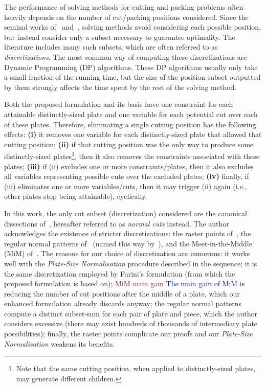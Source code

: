 \documentclass[ppgc,tese,english,formais,babel]{iiufrgs}
\newif\iffinalversion
\newcommand{\newtext}[1]{\iffinalversion%
#1%
\else%
\textcolor{blue}{#1}%
\fi%
}
\newcommand{\oldtext}[1]{\iffinalversion%
\else%
\textcolor{red}{#1}%
\fi%
}
\begin{document}
The performance of solving methods for cutting and packing problems often heavily depends on the number of cut/packing positions considered.
Since the seminal works of~\citet{cw:1977} and~\citet{herz:1972}, solving methods avoid considering each possible position, but instead consider only a subset necessary to guarantee optimality.
The literature includes many such subsets, which are often referred to as \emph{discretizations}.
The most common way of computing these discretizations are Dynamic Programming (DP) algorithms.
These DP algorithms usually only take a small fraction of the running time, but the size of the position subset outputted by them strongly affects the time spent by the rest of the solving method.

Both the proposed formulation and its basis have one constraint for each attainable distinctly-sized plate and one variable for each potential cut over each of these plates.
Therefore, eliminating a single cutting position has the following effects:
\textbf{(i)} it removes one variable for each distinctly-sized plate that allowed that cutting position;
\textbf{(ii)} if that cutting position was the only way to produce some distinctly-sized plates\footnote{Note that the same cutting position, when applied to distinctly-sized plates, may generate different children.}, then it also removes the constraints associated with these plates;
\textbf{(iii)} if (ii) excludes one or more constraints/plates, then it also excludes all variables representing possible cuts over the excluded plates;
\textbf{(iv)} finally, if (iii) eliminates one or more variables/cuts, then it may trigger (ii) again (i.e., other plates stop being attainable), cyclically.

In this work, the only cut subset (discretization) considered are the canonical dissections of~\citet{herz:1972}, hereafter referred to as \emph{normal cuts} instead.
The author acknowledges the existence of stricter discretizations: the raster points of~\citet{terno:1987,guntram:1966}, the regular normal patterns of~\citet{boschetti:2002} (named this way by~\citet{cote:2018}), and the Meet-in-the-Middle (MiM) of~\citet{cote:2018}.
The reasons for our choice of discretization are numerous:
it works well with the \emph{Plate-Size Normalisation} procedure described in the sequence;
it is the same discretization employed by Furini's formulation (from which the proposed formulation is based on);
\oldtext{MiM main gain}\newtext{The main gain of MiM} is reducing the number of cut positions after the middle of a plate, which our enhanced formulation already discards anyway;
the regular normal patterns compute a distinct subset-sum for each pair of plate and piece, which the author considers excessive (there may exist hundreds of thousands of intermediary plate possibilities);
finally, the raster points complicate our proofs and our \emph{Plate-Size Normalisation} weakens its benefits.
\end{document}
